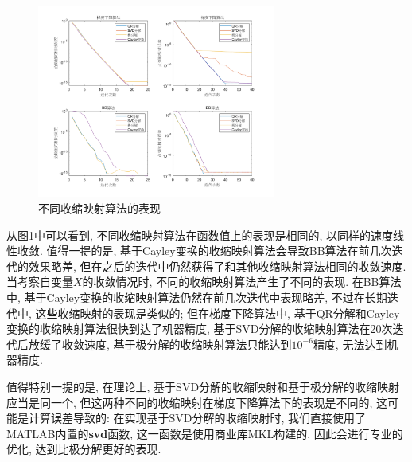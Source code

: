\documentclass[UTF8]{ctexart}
\begin{document}
\begin{figure}[htb]
    \centering
    \includegraphics[width=0.7\textwidth]{Q2-figure/2.png}
    \caption{不同收缩映射算法的表现}\label{fig2}
\end{figure}
从图\ref{fig2}中可以看到, 不同收缩映射算法在函数值上的表现是相同的, 以同样的速度线性收敛. 值得一提的是, 基于Cayley变换的收缩映射算法会导致BB算法在前几次迭代的效果略差, 但在之后的迭代中仍然获得了和其他收缩映射算法相同的收敛速度. 当考察自变量$X$的收敛情况时, 不同的收缩映射算法产生了不同的表现. 在BB算法中, 基于Cayley变换的收缩映射算法仍然在前几次迭代中表现略差, 不过在长期迭代中, 这些收缩映射的表现是类似的; 但在梯度下降算法中, 基于QR分解和Cayley变换的收缩映射算法很快到达了机器精度, 基于SVD分解的收缩映射算法在20次迭代后放缓了收敛速度, 基于极分解的收缩映射算法只能达到$10^{-6}$精度, 无法达到机器精度. \par
值得特别一提的是, 在理论上, 基于SVD分解的收缩映射和基于极分解的收缩映射应当是同一个, 但这两种不同的收缩映射在梯度下降算法下的表现是不同的, 这可能是计算误差导致的: 在实现基于SVD分解的收缩映射时, 我们直接使用了MATLAB内置的\textbf{svd}函数, 这一函数是使用商业库MKL构建的, 因此会进行专业的优化, 达到比极分解更好的表现. \par
\end{document}
